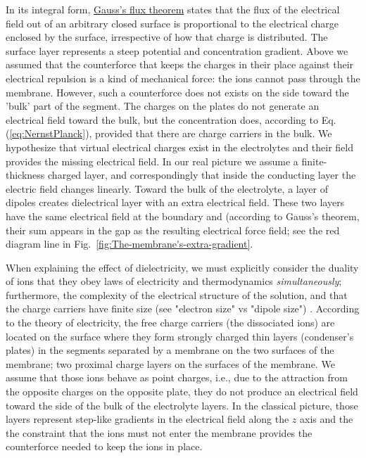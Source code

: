 In its integral form, \href{https://en.wikipedia.org/wiki/Gauss_law}
{Gauss's flux theorem} states that the flux of the electrical field out of an arbitrary closed surface is proportional to the electrical charge enclosed by the surface, irrespective of how that charge is distributed.
The surface layer represents a steep potential and concentration gradient.
Above we assumed that the counterforce that keeps the charges in their place
against their electrical repulsion is a kind of mechanical force: the ions cannot pass through the membrane.
However, such a counterforce does not exists on the side toward the 'bulk' part of the segment. 
The charges on the plates do not generate an electrical field
toward the bulk, but the concentration does, according to Eq.(\ref{eq:NernstPlanck}), provided that there are charge carriers in the bulk. 
We hypothesize that virtual 
electrical charges exist in the electrolytes and their field provides the missing electrical field. 
In our real picture we assume a finite-thickness charged layer, 
and correspondingly that inside the conducting layer the electric
field changes linearly. Toward the bulk of the electrolyte, 
a layer of dipoles creates dielectrical layer with an extra electrical field. These two layers
have the same electrical field at the boundary and (according to Gauss's theorem, their sum appears in the gap as the resulting electrical force field; see the red diagram line in Fig.~\ref{fig:The-membrane's-extra-gradient}.


When explaining the effect of dielectricity, we must explicitly consider the duality of ions that they obey laws of electricity and thermodynamics \textit{simultaneously}; furthermore, the complexity of the electrical structure of the solution,  and that the charge carriers have finite size (see "electron size" vs "dipole size") .
According to the theory of electricity, the free charge carriers (the dissociated ions) are located on the surface where they form strongly charged thin layers (condenser's plates) in the segments separated by a membrane on the two surfaces of the membrane; two proximal charge layers on the surfaces of the membrane.
We assume that those ions behave as point charges, i.e., 
due to the attraction from the opposite charges on the opposite plate,
they do not produce an electrical field toward
the side of the bulk of the electrolyte layers.
In the classical picture, those layers represent step-like gradients in the electrical field along the $z$ axis
and the the constraint that the ions must not enter the membrane
provides the counterforce needed to keep the ions in place.



